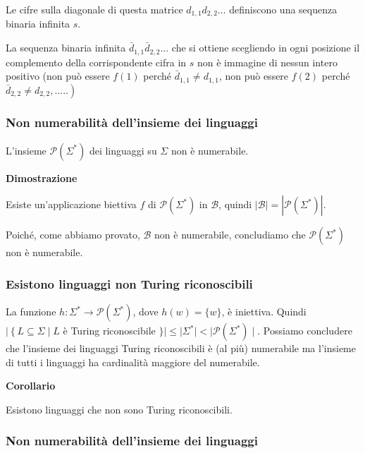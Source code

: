 Le cifre sulla diagonale di questa matrice $d_{1,1} d_{2,2} \ldots$ definiscono una sequenza binaria infinita $s$.

La sequenza binaria infinita $\bar{d}_{1,1} \bar{d}_{2,2} \ldots$ che si ottiene scegliendo in ogni posizione il complemento della corrispondente cifra in $s$ non è immagine di nessun intero positivo (non può essere $f(1)$ perché $\bar{d}_{1,1} \neq d_{1,1}$, non può essere $f(2)$ perché $\left.\bar{d}_{2,2} \neq d_{2,2}, \ldots . .\right)$

\subsubsection{Non numerabilità dell'insieme dei linguaggi}

L'insieme $\mathcal{P}\left(\Sigma^{*}\right)$ dei linguaggi su $\Sigma$ non è numerabile. 

\vspace{5mm}

\textbf{Dimostrazione}

Esiste un'applicazione biettiva $f$ di $\mathcal{P}\left(\Sigma^{*}\right)$ in $\mathcal{B}$, quindi $|\mathcal{B}|=\left|\mathcal{P}\left(\Sigma^{*}\right)\right|$.

Poiché, come abbiamo provato, $\mathcal{B}$ non è numerabile, concludiamo che $\mathcal{P}\left(\Sigma^{*}\right)$ non è numerabile.

\subsubsection{Esistono linguaggi non Turing riconoscibili}

La funzione $h: \Sigma^{*} \rightarrow \mathcal{P}\left(\Sigma^{*}\right)$, dove $h(w)=\{w\}$, è iniettiva. Quindi
$\mid\left\{L \subseteq \Sigma \mid L\right.$ è Turing riconoscibile $\}|\leq| \Sigma^{*}|<| \mathcal{P}\left(\Sigma^{*}\right) \mid$.
Possiamo concludere che l'insieme dei linguaggi Turing riconoscibili è (al più) numerabile ma l'insieme di tutti i linguaggi ha cardinalità maggiore del numerabile.

\vspace{5mm}

\textbf{Corollario}

Esistono linguaggi che non sono Turing riconoscibili.

\subsubsection{Non numerabilità dell'insieme dei linguaggi}


